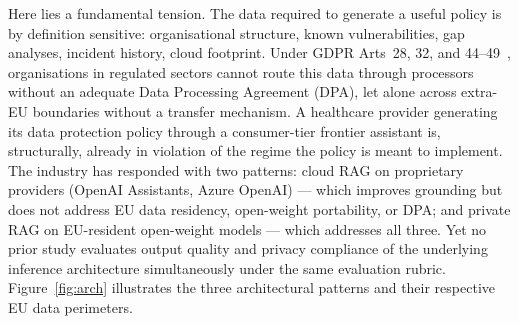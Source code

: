\documentclass[runningheads]{llncs}
\begin{document}
Here lies a fundamental tension. The data required to generate a useful
policy is by definition sensitive: organisational structure, known
vulnerabilities, gap analyses, incident history, cloud footprint. Under
GDPR Arts~28, 32, and 44--49~\cite{gdpr2016}, organisations in regulated
sectors cannot route this data through processors without an adequate Data
Processing Agreement (DPA), let alone across extra-EU boundaries without a
transfer mechanism. A healthcare provider generating its data protection
policy through a consumer-tier frontier assistant is, structurally, already
in violation of the regime the policy is meant to implement. The industry
has responded with two patterns: cloud RAG on proprietary providers
(OpenAI Assistants, Azure OpenAI) --- which improves grounding but does not
address EU data residency, open-weight portability, or DPA; and private RAG
on EU-resident open-weight models --- which addresses all three. Yet no
prior study evaluates output quality and privacy compliance of the
underlying inference architecture simultaneously under the same evaluation
rubric. Figure~\ref{fig:arch} illustrates the three architectural patterns
and their respective EU data perimeters.
\end{document}
